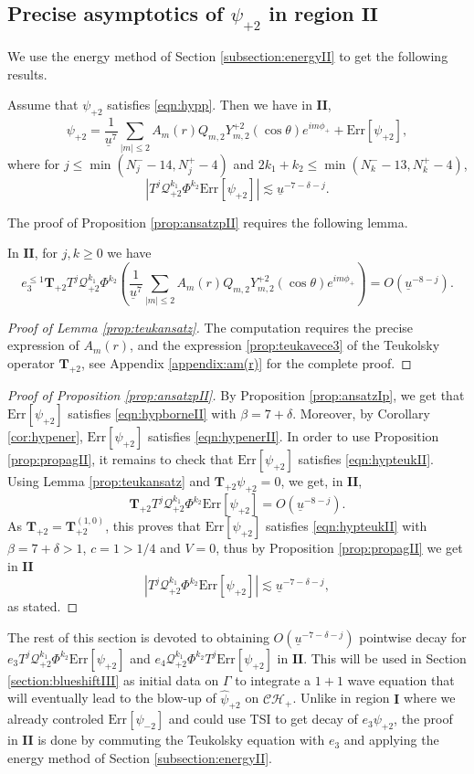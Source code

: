 \documentclass[reqno]{amsart}
\numberwithin{equation}{section}
\newcommand{\mcq}{\mathcal{Q}}
\newcommand{\ubar}{{\underline{u}}}
\newcommand{\errp}{\mathrm{Err}[\Psip]}
\newcommand{\errm}{\mathrm{Err}[\Psim]}
\newcommand{\carterp}{\mcq_{+2}}
\newcommand{\ch}{\mathcal{CH_+}}
\newcommand{\teuk}{\mathbf{T}}
\newcommand{\psihat}{\widehat{\psi}}
\newcommand{\un}{\mathbf{I}}
\newcommand{\deux}{\mathbf{II}}
\newcommand{\Psip}{\psi_{+2}}
\newcommand{\psip}{\psi_{+2}}
\newcommand{\Psim}{\psi_{-2}}
\newcommand{\psihatp}{\psihat_{+2}}
\newcommand{\sfrak}{2}
\newcommand{\fraks}{2}
\newcommand{\ansatzp}{\frac{1}{\ubar^{7}}\sum_{|m|\leq2}A_m(r)Q_{m,\sfrak}Y_{m,\sfrak}^{+\sfrak}(\cos\theta)e^{im\phi_{+}}}
\theoremstyle{plain}
\theoremstyle{definition}
\theoremstyle{remark}
\numberwithin{equation}{section}
\begin{document}
\subsection{Precise asymptotics of $\psi_{+2}$ in region $\mathbf{II}$}
We use the energy method of Section \ref{subsection:energyII} to get the following results.
\begin{prop}\label{prop:ansatzpII}
    Assume that $\Psip$ satisfies \eqref{eqn:hypp}. Then we have in $\deux$, 
    $$\psi_{+2}=\ansatzp+\errp,$$
    where for $j\leq \min(N_j^--14,N_j^+-4)$ and $2k_1+k_2\leq \min(N_k^--13,N_k^+-4)$, 
    $$|T^j\mcq_{+2}^{k_1}\Phi^{k_2}\errp|\lesssim\ubar^{-7-\delta-j}.$$
\end{prop}
The proof of Proposition \ref{prop:ansatzpII} requires the following lemma. 
\begin{lem}\label{prop:teukansatz}
    In $\deux$, for $j,k\geq 0$ we have
$$e_3^{\leq 1}\teuk_{+\fraks}T^j\mcq_{+2}^{k_1}\Phi^{k_2}\left(\frac{1}{\ubar^{7}}\sum_{|m|\leq2}A_m(r)Q_{m,\sfrak}Y_{m,\sfrak}^{+\sfrak}(\cos\theta)e^{im\phi_{+}}\right)=O(\ubar^{-8-j}). $$
\end{lem}
\begin{proof}[Proof of Lemma \ref{prop:teukansatz}]
    The computation requires the precise expression of $A_m(r)$, and the expression \eqref{prop:teukavece3} of the Teukolsky operator $\teuk_{+2}$, see Appendix \ref{appendix:am(r)} for the complete proof.
\end{proof}
\begin{proof}[Proof of Proposition \ref{prop:ansatzpII}]
By Proposition \ref{prop:ansatzIp}, we get that $\errp$ satisfies \eqref{eqn:hypborneII} with $\beta=7+\delta$. Moreover, by Corollary \ref{cor:hypener}, $\errp$ satisfies \eqref{eqn:hypenerII}. In order to use Proposition \ref{prop:propagII}, it remains to check that $\errp$ satisfies \eqref{eqn:hypteukII}. Using Lemma \ref{prop:teukansatz} and $\teuk_{+2}\Psip=0$, we get, in $\deux$, 
$$\teuk_{+\fraks}T^j\mcq_{+2}^{k_1}\Phi^{k_2}\errp=O(\ubar^{-8-j}).$$
{As $\teuk_{+2}=\teuk_{+2}^{(1,0)}$}, this proves that $\errp$ satisfies \eqref{eqn:hypteukII} with $\beta=7+\delta>1$, $c=1>1/4$ and $V=0$, thus by Proposition \ref{prop:propagII} we get in $\deux$
$$|T^j\mcq_{+2}^{k_1}\Phi^{k_2}\errp|\lesssim\ubar^{-7-\delta-j},$$
as stated.
\end{proof}
The rest of this section is devoted to obtaining $O(\ubar^{-7-\delta-j})$ pointwise decay for $e_3 T^j\mcq_{+2}^{k_1}\Phi^{k_2}\errp$ and $e_4\carterp^{k_1}\Phi^{k_2}T^j\errp$ in $\deux$. This will be used in Section \ref{section:blueshiftIII} as initial data on $\Gamma$ to integrate a $1+1$ wave equation that will eventually lead to the blow-up of $\psihatp$ on $\ch$. Unlike in region $\un$ where we already controled $\errm$ and could use TSI to get decay of $e_3\psip$, the proof in $\deux$ is done by commuting the Teukolsky equation with $e_3$ and applying the energy method of Section \ref{subsection:energyII}.
\end{document}
